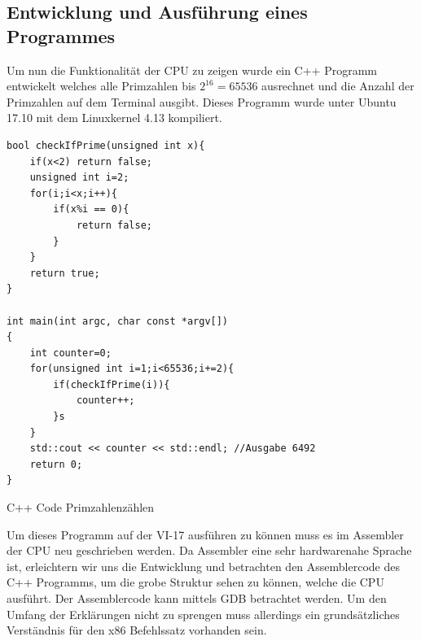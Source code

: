 \documentclass[12pt]{article}
\begin{document}
\newpage
\subsection{Entwicklung und Ausführung eines Programmes}


Um nun die Funktionalität der CPU zu zeigen wurde ein C++ Programm entwickelt welches alle Primzahlen bis $2^{16} = 65536$ ausrechnet und die Anzahl der Primzahlen auf dem Terminal ausgibt. Dieses Programm wurde unter Ubuntu 17.10 mit dem Linuxkernel 4.13 kompiliert.

\begin{code}[!htb]
\begin{lstlisting}
bool checkIfPrime(unsigned int x){
	if(x<2) return false;
	unsigned int i=2;
	for(i;i<x;i++){
		if(x%i == 0){
			return false;
		}
	}
	return true;
}

int main(int argc, char const *argv[])
{
	int counter=0;
	for(unsigned int i=1;i<65536;i+=2){
		if(checkIfPrime(i)){
			counter++;
		}s
	}
	std::cout << counter << std::endl; //Ausgabe 6492
	return 0;
}
\end{lstlisting}
\caption[C++ Code Primzahlenzählen]{C++ Code Primzahlenzählen}
\end{code}



Um dieses Programm auf der VI-17 ausführen zu können muss es im Assembler der CPU neu geschrieben werden. Da Assembler eine sehr hardwarenahe Sprache ist, erleichtern wir uns die Entwicklung und betrachten den Assemblercode des C++ Programms, um die grobe Struktur sehen zu können, welche die CPU ausführt. Der Assemblercode kann mittels GDB betrachtet werden. Um den Umfang der Erklärungen nicht zu sprengen muss allerdings ein grundsätzliches Verständnis für den x86 Befehlssatz vorhanden sein.
\newpage
\end{document}
